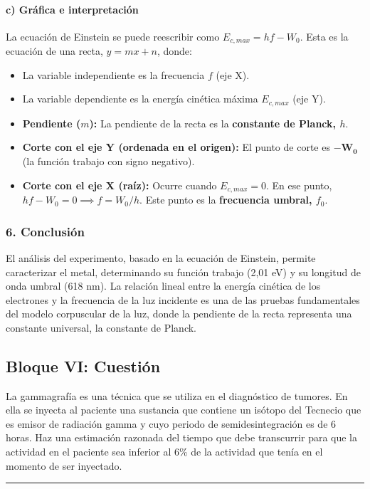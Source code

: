 \paragraph{c) Gráfica e interpretación}
La ecuación de Einstein se puede reescribir como $E_{c,max} = hf - W_0$.
Esta es la ecuación de una recta, $y = mx + n$, donde:
\begin{itemize}
    \item La variable independiente es la frecuencia $f$ (eje X).
    \item La variable dependiente es la energía cinética máxima $E_{c,max}$ (eje Y).
    \item \textbf{Pendiente ($m$):} La pendiente de la recta es la \textbf{constante de Planck, $h$}.
    \item \textbf{Corte con el eje Y (ordenada en el origen):} El punto de corte es $\boldsymbol{-W_0}$ (la función trabajo con signo negativo).
    \item \textbf{Corte con el eje X (raíz):} Ocurre cuando $E_{c,max}=0$. En ese punto, $hf-W_0=0 \implies f=W_0/h$. Este punto es la \textbf{frecuencia umbral, $f_0$}.
\end{itemize}

\subsubsection*{6. Conclusión}
\begin{cajaconclusion}
El análisis del experimento, basado en la ecuación de Einstein, permite caracterizar el metal, determinando su función trabajo (2,01 eV) y su longitud de onda umbral (618 nm). La relación lineal entre la energía cinética de los electrones y la frecuencia de la luz incidente es una de las pruebas fundamentales del modelo corpuscular de la luz, donde la pendiente de la recta representa una constante universal, la constante de Planck.
\end{cajaconclusion}

\newpage

\subsection{Bloque VI: Cuestión}
\label{subsec:B6_2011_jun_ord}

\begin{cajaenunciado}
La gammagrafía es una técnica que se utiliza en el diagnóstico de tumores. En ella se inyecta al paciente una sustancia que contiene un isótopo del Tecnecio que es emisor de radiación gamma y cuyo periodo de semidesintegración es de 6 horas. Haz una estimación razonada del tiempo que debe transcurrir para que la actividad en el paciente sea inferior al 6\% de la actividad que tenía en el momento de ser inyectado.
\end{cajaenunciado}
\hrule

